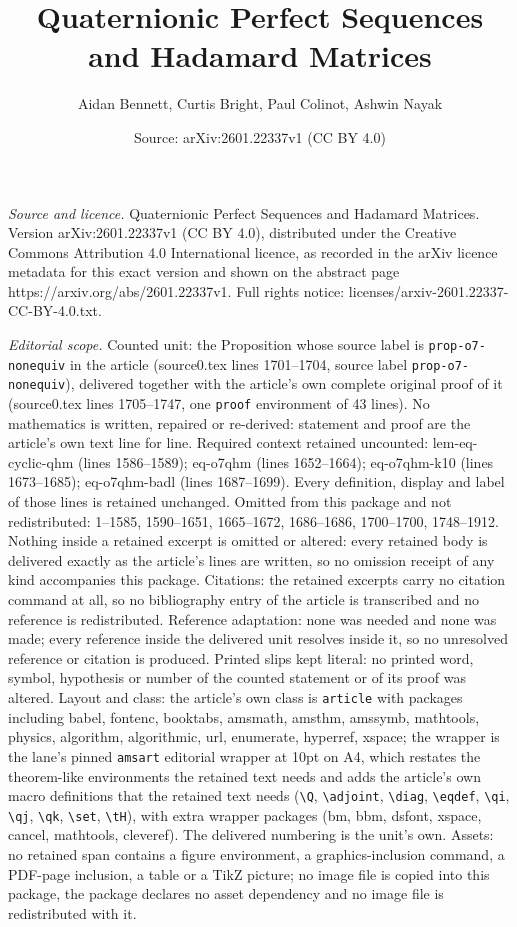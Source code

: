 \documentclass[10pt,a4paper]{amsart}
\title[Quaternionic Perfect Sequences and Hadamard Matrices]{Quaternionic Perfect Sequences and Hadamard Matrices}
\author{Aidan Bennett, Curtis Bright, Paul Colinot, Ashwin Nayak}
\date{Source: arXiv:2601.22337v1 (CC BY 4.0)}
\begin{document}
\maketitle

\noindent\emph{Source and licence.} Quaternionic Perfect Sequences and Hadamard Matrices. Version arXiv:2601.22337v1 (CC BY 4.0), distributed under the Creative Commons Attribution 4.0 International licence, as recorded in the arXiv licence metadata for this exact version and shown on the abstract page https://arxiv.org/abs/2601.22337v1. Full rights notice: licenses/arxiv-2601.22337-CC-BY-4.0.txt.\par\smallskip

\noindent\textit{Editorial scope.} Counted unit: the Proposition whose source label is \texttt{prop-o7-nonequiv} in the article (source0.tex lines 1701--1704, source label \texttt{prop-o7-nonequiv}), delivered together with the article's own complete original proof of it (source0.tex lines 1705--1747, one \texttt{proof} environment of 43 lines). No mathematics is written, repaired or re-derived: statement and proof are the article's own text line for line. Required context retained uncounted: lem-eq-cyclic-qhm (lines 1586--1589); eq-o7qhm (lines 1652--1664); eq-o7qhm-k10 (lines 1673--1685); eq-o7qhm-badl (lines 1687--1699). Every definition, display and label of those lines is retained unchanged. Omitted from this package and not redistributed: 1--1585, 1590--1651, 1665--1672, 1686--1686, 1700--1700, 1748--1912. Nothing inside a retained excerpt is omitted or altered: every retained body is delivered exactly as the article's lines are written, so no omission receipt of any kind accompanies this package. Citations: the retained excerpts carry no citation command at all, so no bibliography entry of the article is transcribed and no reference is redistributed. Reference adaptation: none was needed and none was made; every reference inside the delivered unit resolves inside it, so no unresolved reference or citation is produced. Printed slips kept literal: no printed word, symbol, hypothesis or number of the counted statement or of its proof was altered. Layout and class: the article's own class is \texttt{article} with packages including babel, fontenc, booktabs, amsmath, amsthm, amssymb, mathtools, physics, algorithm, algorithmic, url, enumerate, hyperref, xspace; the wrapper is the lane's pinned \texttt{amsart} editorial wrapper at 10pt on A4, which restates the theorem-like environments the retained text needs and adds the article's own macro definitions that the retained text needs (\texttt{\textbackslash Q}, \texttt{\textbackslash adjoint}, \texttt{\textbackslash diag}, \texttt{\textbackslash eqdef}, \texttt{\textbackslash qi}, \texttt{\textbackslash qj}, \texttt{\textbackslash qk}, \texttt{\textbackslash set}, \texttt{\textbackslash tH}), with extra wrapper packages (bm, bbm, dsfont, xspace, cancel, mathtools, cleveref). The delivered numbering is the unit's own. Assets: no retained span contains a figure environment, a graphics-inclusion command, a PDF-page inclusion, a table or a TikZ picture; no image file is copied into this package, the package declares no asset dependency and no image file is redistributed with it. 
\end{document}
